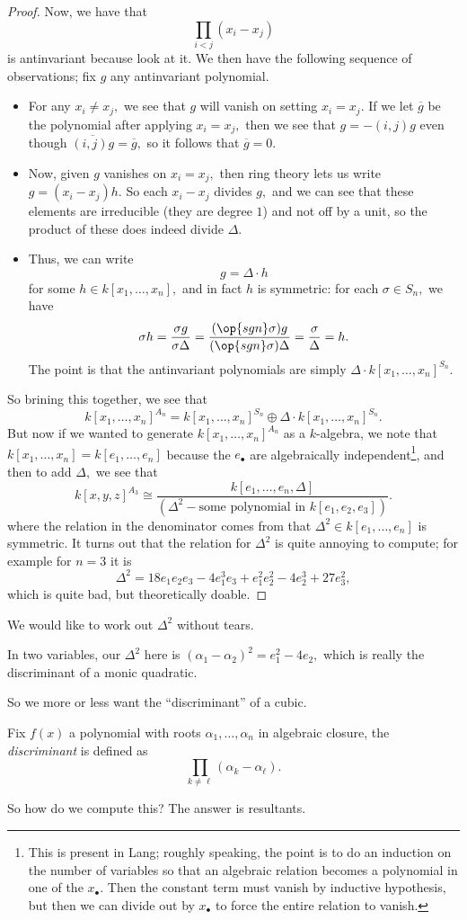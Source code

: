 \documentclass[../notes.tex]{subfiles}
\begin{document}
\begin{proof}
	Now, we have that
	\[\prod_{i<j}(x_i-x_j)\]
	is antinvariant because look at it. We then have the following sequence of observations; fix $g$ any antinvariant polynomial.
	\begin{itemize}
		\item For any $x_i\ne x_j,$ we see that $g$ will vanish on setting $x_i=x_j.$ If we let $\overline g$ be the polynomial after applying $x_i=x_j,$ then we see that $g=-(i,j)g$ even though $\overline{(i,j)g}=\overline g,$ so it follows that $\overline g=0.$
		\item Now, given $g$ vanishes on $x_i=x_j,$ then ring theory lets us write $g=(x_i-x_j)h.$ So each $x_i-x_j$ divides $g,$ and we can see that these elements are irreducible (they are degree $1$) and not off by a unit, so the product of these does indeed divide $\Delta.$
		\item Thus, we can write
		\[g=\Delta\cdot h\]
		for some $h\in k[x_1,\ldots,x_n],$ and in fact $h$ is symmetric: for each $\sigma\in S_n,$ we have
		\[\sigma h=\frac{\sigma g}{\sigma\Delta}=\frac{(\op{sgn}\sigma)g}{(\op{sgn}\sigma)\Delta}=\frac\sigma\Delta=h.\]
		The point is that the antinvariant polynomials are simply $\Delta\cdot k[x_1,\ldots,x_n]^{S_n}.$
	\end{itemize}
	So brining this together, we see that
	\[k[x_1,\ldots,x_n]^{A_n}=k[x_1,\ldots,x_n]^{S_n}\oplus\Delta\cdot k[x_1,\ldots,x_n]^{S_n}.\]
	But now if we wanted to generate $k[x_1,\ldots,x_n]^{A_n}$ as a $k$-algebra, we note that $k[x_1,\ldots,x_n]=k[e_1,\ldots,e_n]$ because the $e_\bullet$ are algebraically independent\footnote{This is present in Lang; roughly speaking, the point is to do an induction on the number of variables so that an algebraic relation becomes a polynomial in one of the $x_\bullet.$ Then the constant term must vanish by inductive hypothesis, but then we can divide out by $x_\bullet$ to force the entire relation to vanish.}, and then to add $\Delta,$ we see that
	\[k[x,y,z]^{A_3}\cong\frac{k[e_1,\ldots,e_n,\Delta]}{\left(\Delta^2-\text{some polynomial in }k[e_1,e_2,e_3]\right)}.\]
	where the relation in the denominator comes from that $\Delta^2\in k[e_1,\ldots,e_n]$ is symmetric. It turns out that the relation for $\Delta^2$ is quite annoying to compute; for example for $n=3$ it is
	\[\Delta^2=18e_1e_2e_3-4e_1^3e_3+e_1^2e_2^2-4e_2^3+27e_3^2,\]
	which is quite bad, but theoretically doable.
\end{proof}

We would like to work out $\Delta^2$ without tears.
\begin{example}
	In two variables, our $\Delta^2$ here is $(\alpha_1-\alpha_2)^2=e_1^2-4e_2,$ which is really the discriminant of a monic quadratic.
\end{example}
So we more or less want the ``discriminant'' of a cubic.
\begin{definition}[Discriminant]
	Fix $f(x)$ a polynomial with roots $\alpha_1,\ldots,\alpha_n$ in algebraic closure, the \textit{discriminant} is defined as
	\[\prod_{k\ne\ell}(\alpha_k-\alpha_\ell).\]
\end{definition}
So how do we compute this? The answer is resultants.
\end{document}
